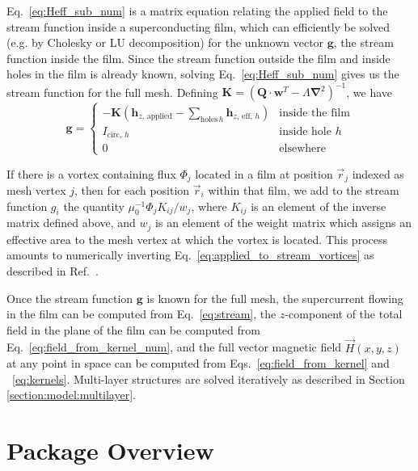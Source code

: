 \documentclass[final,3p,times,twocolumn]{elsarticle}
\newcounter{bla}
\begin{document}
Eq.~\ref{eq:Heff_sub_num} is a matrix equation relating the applied field to the stream function
inside a superconducting film, which can efficiently be solved (e.g. by Cholesky or LU decomposition) for the unknown vector $\mathbf{g}$, the stream function inside the film. Since the stream function outside the film and inside holes in the film is already known, solving Eq.~\ref{eq:Heff_sub_num} gives us the stream function for the full mesh. Defining $\mathbf{K} = \left(\mathbf{Q}\cdot\mathbf{w}^T-\Lambda\mathbf{\nabla}^2\right)^{-1}$, we have
\begin{equation}
    \label{eq:full_stream}
    \mathbf{g} = \begin{cases}
        -\mathbf{K}
        \left(\mathbf{h}_{z,\,\mathrm{applied}} - \sum_{\mathrm{holes}\,h}\mathbf{h}_{z,\,\mathrm{eff},\,h}\right)
            & \text{inside the film}\\
        I_{\mathrm{circ},\,h}
            & \text{inside hole }h\\
        0
            & \text{elsewhere}
    \end{cases}
\end{equation}

If there is a vortex containing flux $\Phi_j$ located in a film at position $\vec{r}_j$ indexed as mesh vertex $j$, then for each position $\vec{r}_i$ within that film, we add to the stream function $g_i$ the quantity $\mu_0^{-1}\Phi_jK_{ij} / w_{j}$, where $K_{ij}$ is an element of the inverse matrix defined above, and $w_{j}$ is an element of the weight matrix which assigns an effective area to the mesh vertex at which the vortex is located. This process amounts to numerically inverting Eq.~\ref{eq:applied_to_stream_vortices} as described in Ref.~\cite{Brandt2005-wj}.

Once the stream function $\mathbf{g}$ is known for the full mesh,
the supercurrent flowing in the film can be computed from Eq.~\ref{eq:stream}, the $z$-component of the total field in the plane of the film can be computed
from Eq.~\ref{eq:field_from_kernel_num}, and the full vector magnetic field $\vec{H}(x, y, z)$
at any point in space can be computed from Eqs.~\ref{eq:field_from_kernel} and ~\ref{eq:kernels}. Multi-layer structures are solved iteratively as described in Section \ref{section:model:multilayer}.

\section{Package Overview}
\label{section:overview}
\end{document}
